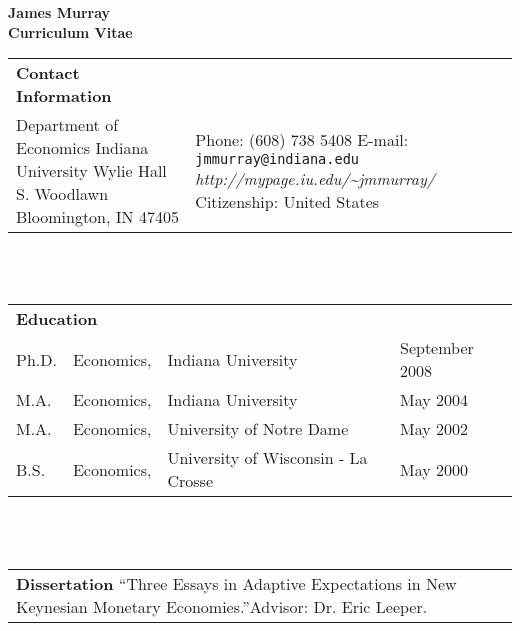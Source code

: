 \begin{center} 
\textbf{\Large{James Murray}}\\
\textbf{Curriculum Vitae}\\
\end{center}
\small 

\begin{tabular}{p{3in} p{3in}}
\textbf{Contact Information} & \\
Department of Economics \newline
Indiana University\newline
105 Wylie Hall\newline
100 S. Woodlawn\newline 
Bloomington, IN 47405 &
Phone: (608) 738 5408\newline
E-mail: \texttt{jmmurray@indiana.edu}\newline
\textit{http://mypage.iu.edu/\~{}jmmurray/} \newline \newline
Citizenship: United States
\end{tabular} \\ \\

\begin{tabular}{p{.5in} p{.6in} p{2.5in} p{2in}}
\multicolumn{2}{l}{\textbf{Education} \newline} & \\

Ph.D. & Economics, & Indiana University & September 2008 \\
M.A. & Economics, & Indiana University & May 2004  \\
M.A. & Economics, & University of Notre Dame & May 2002 \\
B.S. & Economics, & University of Wisconsin - La Crosse & May 2000 \\
\end{tabular} \\ \\

\begin{tabular}{p{5.5in}}
\textbf{Dissertation} \newline
``Three Essays in Adaptive Expectations in New Keynesian Monetary Economies.''\newline  Advisor: Dr. Eric Leeper.
\end{tabular} \\ \\


